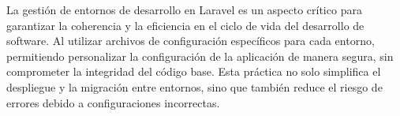 La gestión de entornos de desarrollo en Laravel es un aspecto crítico para garantizar la coherencia y la eficiencia en el ciclo de vida del desarrollo de software. Al utilizar archivos de configuración específicos para cada entorno, permitiendo personalizar la configuración de la aplicación de manera segura, sin comprometer la integridad del código base. Esta práctica no solo simplifica el despliegue y la migración entre entornos, sino que también reduce el riesgo de errores debido a configuraciones incorrectas. 

